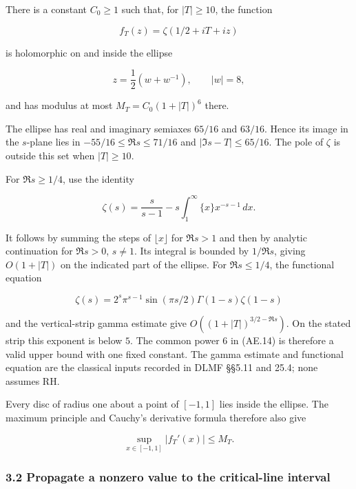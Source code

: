 There is a constant \(C_0\ge1\) such that, for \(|T|\ge10\), the
function

\[
 f_T(z)=\zeta(1/2+iT+iz)                                                \tag{AE.14}\label{AE.eq.14}
\]

is holomorphic on and inside the ellipse

\[
 z=\frac12(w+w^{-1}),\qquad |w|=8,
                                                                         \tag{AE.15}\label{AE.eq.15}
\]

and has modulus at most \(M_T=C_0(1+|T|)^6\) there.

The ellipse has real and imaginary semiaxes \(65/16\) and \(63/16\).
Hence its image in the \(s\)-plane lies in \(-55/16\le\Re s\le71/16\)
and \(|\Im s-T|\le65/16\). The pole of \(\zeta\) is outside this set
when \(|T|\ge10\).

For \(\Re s\ge1/4\), use the identity

\[
 \zeta(s)=\frac{s}{s-1}-s\int_1^\infty\{x\}x^{-s-1}\,dx.              \tag{AE.16}\label{AE.eq.16}
\]

It follows by summing the steps of \(\lfloor x\rfloor\) for \(\Re s>1\)
and then by analytic continuation for \(\Re s>0\), \(s\ne1\). Its
integral is bounded by \(1/\Re s\), giving \(O(1+|T|)\) on the indicated
part of the ellipse. For \(\Re s\le1/4\), the functional equation

\[
 \zeta(s)=2^s\pi^{s-1}\sin(\pi s/2)\Gamma(1-s)\zeta(1-s)              \tag{AE.17}\label{AE.eq.17}
\]

and the vertical-strip gamma estimate give \(O((1+|T|)^{3/2-\Re s})\).
On the stated strip this exponent is below \(5\). The common power \(6\)
in (AE.14) is therefore a valid upper bound with one fixed constant. The
gamma estimate and functional equation are the classical inputs recorded
in DLMF §§5.11 and 25.4; none assumes RH.

Every disc of radius one about a point of \([-1,1]\) lies inside the
ellipse. The maximum principle and Cauchy's derivative formula therefore
also give

\[
 \sup_{x\in[-1,1]}|f_T'(x)|\le M_T.                                    \tag{AE.18}\label{AE.eq.18}
\]

\subsubsection*{3.2 Propagate a nonzero value to the critical-line
interval}
\label{AE.propagate-a-nonzero-value-to-the-critical-line-interval}

